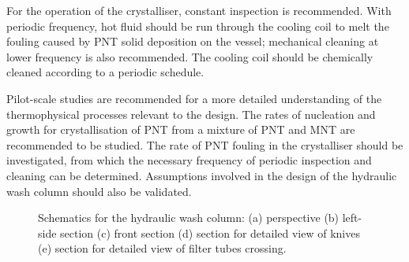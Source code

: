 For the operation of the crystalliser, constant inspection is recommended. With periodic frequency, hot fluid should be run through the cooling coil to melt the fouling caused by PNT solid deposition on the vessel; mechanical cleaning at lower frequency is also recommended. The cooling coil should be chemically cleaned according to a periodic schedule. 


Pilot-scale studies are recommended for a more detailed understanding of the thermophysical processes relevant to the design. The rates of nucleation and growth for crystallisation of PNT from a mixture of PNT and MNT are recommended to be studied. The rate of PNT fouling in the crystalliser should be investigated, from which the necessary frequency of periodic inspection and cleaning can be determined. Assumptions involved in the design of the hydraulic wash column should also be validated. 

\begin{figure}[H]
    \centering
    
    \caption{Schematics for the hydraulic wash column: (a) perspective (b) left-side section (c) front section (d) section for detailed view of knives (e) section for detailed view of filter tubes crossing.}
    \label{fig:wash column schematic}
\end{figure}





